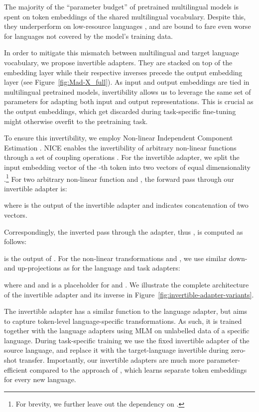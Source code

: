 \documentclass[11pt,a4paper]{article}
\begin{document}
The majority of the ``parameter budget'' of pretrained multilingual models is spent on token embeddings of the shared multilingual vocabulary. Despite this, they underperform on low-resource languages \cite{Artetxe2020cross-lingual,Conneau2020xlm-r}, and are bound to fare even worse for languages not covered by the model's training data.  

In order to mitigate this mismatch between multilingual and target language vocabulary, we propose invertible adapters. They are stacked on top of the embedding layer while their respective inverses precede the output embedding layer (see Figure~\ref{fig:Mad-X_full}).  As input and output embeddings are tied in multilingual pretrained models, invertibility allows us to leverage the same set of parameters for adapting both input and output representations. This is crucial as the output embeddings, which get discarded during task-specific fine-tuning might otherwise overfit to the pretraining task. 

To ensure this invertibility, we employ Non-linear Independent Component Estimation \cite[NICE;][]{Dinh2014NICE}. NICE enables the invertibility of arbitrary non-linear functions through a set of coupling operations \cite{Dinh2014NICE}.
For the invertible adapter, we split the input embedding vector  of the -th token into two vectors of equal dimensionality .\footnote{For brevity, we further leave out the dependency on .} For two arbitrary non-linear function  and , the forward pass through our invertible adapter  is:

where  is the output of the invertible adapter  and  indicates concatenation of two vectors. 

Correspondingly, the inverted pass through the adapter, thus , is computed as follows:

 is the output of . For the non-linear transformations  and , we use similar down- and up-projections as for the language and task adapters:
\vspace{-1mm}

where  and   and  is a placeholder for  and . We illustrate the complete architecture of the invertible adapter and its inverse in Figure~\ref{fig:invertible-adapter-variants}. 

The invertible adapter has a similar function to the language adapter, but aims to capture token-level language-specific transformations. As such, it is trained together with the language adapters using MLM on unlabelled data of a specific language. During task-specific training we use the fixed invertible adapter of the source language, and replace it with the target-language invertible during zero-shot transfer. Importantly, our invertible adapters are much more parameter-efficient compared to the approach of \citet{Artetxe2020cross-lingual}, which learns separate token embeddings for every new language.
\end{document}
